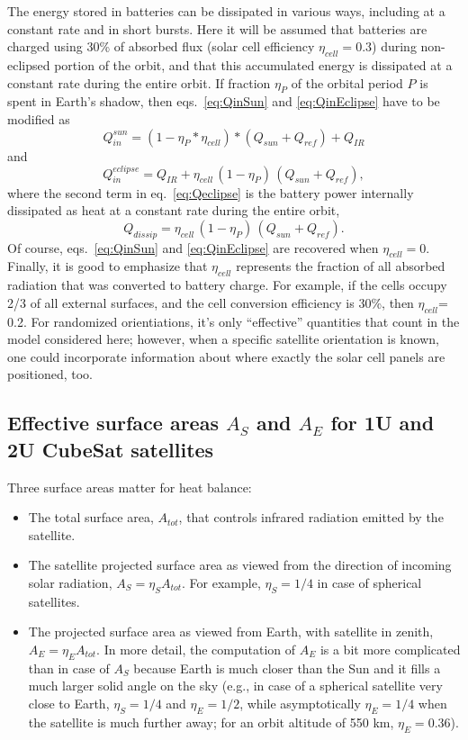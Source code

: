 \documentclass[]{aastex62}
\def\eq#1{\begin{equation} #1 \end{equation}}
\begin{document}
The energy stored in batteries can be dissipated in various ways, including at a constant rate and 
in short bursts. Here it will be assumed that batteries are charged using 30\% of absorbed flux 
(solar cell efficiency $\eta_{cell} = 0.3$) during non-eclipsed portion of the orbit, and that this 
accumulated energy is dissipated at a constant rate during the entire orbit. If fraction $\eta_P$ 
of the orbital period $P$ is spent in Earth's shadow, then eqs.~\ref{eq:QinSun} and \ref{eq:QinEclipse} 
have to be modified as 
\eq{
                  Q_{in}^{sun}  = (1 - \eta_P  * \eta_{cell}) * (Q_{sun} + Q_{ref}) + Q_{IR}    
} 
and 
\eq{
\label{eq:Qeclipse}
                   Q_{in}^{eclipse}  = Q_{IR} +  \eta_{cell} \, (1 - \eta_P) \, (Q_{sun} + Q_{ref}), 
} 
where the second term in eq.~\ref{eq:Qeclipse} is the battery power internally dissipated as heat
at a constant rate during the entire orbit,
\eq{
                   Q_{dissip}  =  \eta_{cell} \, (1 - \eta_P) \, (Q_{sun} + Q_{ref}).
} 
Of course, eqs.~\ref{eq:QinSun} and \ref{eq:QinEclipse} are recovered when $\eta_{cell} = 0$. Finally,
it is good to emphasize that $\eta_{cell}$ represents the fraction of all absorbed radiation that
was converted to battery charge. For example, if the cells occupy 2/3 of all external surfaces, and 
the cell conversion efficiency is 30\%, then $\eta_{cell}$= 0.2. For randomized orientiations, it's only
``effective'' quantities that count in the model considered here; however, when a specific satellite orientation
is known, one could incorporate information about where exactly the solar cell panels are positioned, too.  


\subsection{Effective surface areas $A_S$ and $A_E$  for 1U and 2U CubeSat satellites \label{sec:effA}} 

Three surface areas matter for heat balance: 
\begin{itemize}
\item The total surface area, $A_{tot}$, that controls infrared radiation emitted by the satellite.
\item The satellite projected surface area as viewed from the direction of incoming solar radiation, $A_S=\eta_SA_{tot}$.
     For example, $\eta_S= 1/4$ in case of spherical satellites. 
\item The projected surface area as viewed from Earth, with satellite in zenith, $A_E=\eta_EA_{tot}$. In more
   detail, the computation of $A_E$ is a bit more complicated than in case of $A_S$ because Earth is much closer
   than the Sun and it fills a much larger solid angle on the sky (e.g., in case of a spherical satellite very 
   close to Earth, $\eta_S = 1/4$ and $\eta_E = 1/2$, while asymptotically $\eta_E = 1/4$ when the satellite
   is much further away; for an orbit altitude of 550 km, $\eta_E =0.36$). 
\end{itemize}
\end{document}
